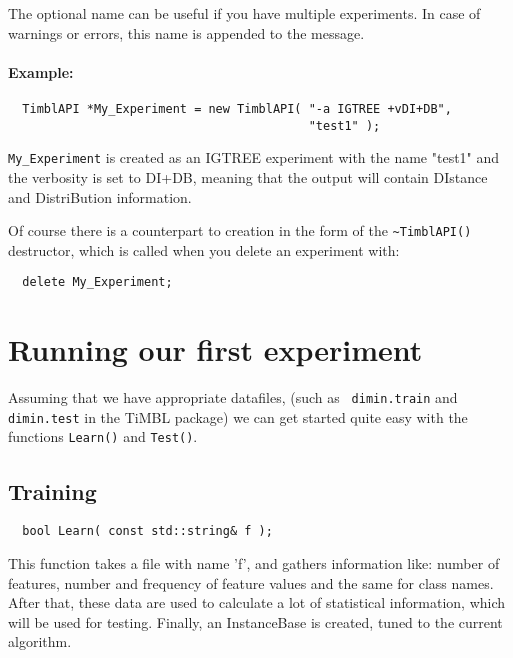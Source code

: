 The optional name can be useful if you have multiple experiments.
In case of warnings or errors, this name is appended to the message.

\paragraph{Example:}

\begin{footnotesize}
\begin{verbatim}
  TimblAPI *My_Experiment = new TimblAPI( "-a IGTREE +vDI+DB", 
                                          "test1" );
\end{verbatim}
\end{footnotesize}

{\tt My\_Experiment} is created as an IGTREE experiment with the name
"test1" and the verbosity is set to DI+DB, meaning that the output
will contain DIstance and DistriBution information.

Of course there is a counterpart to creation in the form of the 
{\tt \~{ }TimblAPI()} destructor, which is called when you delete an
experiment with:

\begin{footnotesize}
\begin{verbatim}
  delete My_Experiment;
\end{verbatim}
\end{footnotesize}

\section{Running our first experiment}

Assuming that we have appropriate datafiles, (such as {\tt
dimin.train} and {\tt dimin.test} in the TiMBL package) we can get
started quite easy with the functions {\tt Learn()} and {\tt Test()}.

\subsection{Training}
\begin{footnotesize}
\begin{verbatim}
  bool Learn( const std::string& f );
\end{verbatim}
\end{footnotesize}

This function takes a file with name 'f', and gathers information
like: number of features, number and frequency of feature values and
the same for class names. After that, these data are used to calculate
a lot of statistical information, which will be used for
testing. Finally, an InstanceBase is created, tuned to the current
algorithm.

